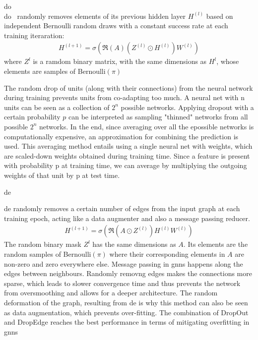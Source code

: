 \ac{do}\\
\ac{do}~\cite{Srivastava2014} randomly removes elements of its previous hidden
layer $H^{(l)}$ based on independent Bernoulli random draws with a constant success rate at each
training iteraration:
\begin{align*}
    H^{(l+1)} = \sigma(\mathfrak{R}(A)(Z^{(l)}\odot H^{(l)}) W^{(l)})
\end{align*}
where $Z^{l}$ is a ramdom binary matrix, with the same dimensions as $H^{l}$, whose
elements are samples of Bernoulli$(\pi)$

The random drop of units (along with their connections) from the neural
network during training prevents units from co-adapting too much.
A neural net with n units can be seen as a collection of $2^{n}$ possible networks.
Applying dropout with a certain probability $p$ can be interpreted as sampling
"thinned" networks from all possible $2^{n}$ networks. In the end, since averaging over
all the epossible networks is computationally expensive, an approximation for
combining the prediction is used. This averaging method entails using
a single neural net with weights, which are scaled-down weights obtained during
training time. Since a feature is present with probability p at training time,
we can average by multiplying the outgoing weights of that unit by p at test time.

\ac{de}

\ac{de}\cite{Rong2020} randomly removes a
certain number of edges from the input graph at each training epoch, acting like a
data augmenter and also a message passing reducer.
\begin{align*}
    H^{(l+1)} = \sigma(\mathfrak{R}(A \odot Z^{(l)}) H^{(l)} W^{(l)})
\end{align*}
The random binary mask $Z^{l}$ has the same dimensions as $A$.
Its elements are the random samples of Bernoulli$(\pi)$ where their
corresponding elements in $A$ are non-zero and zero everywhere else.
Message passing in \acp{gnn} happens along the edges between neighbours.
Randomly removng edges makes the connections more sparse, which
leads to slower convergence time and thus prevents the
network from oversmoothing and allows for a deeper architecture.
The random deformation of the graph, resulting from \ac{de} is why this
method can also be seen as data augmentation, which prevents over-fitting.
The combination of DropOut and DropEdge reaches the best performance in
terms of mitigating overfitting in \acp{gnn} \

